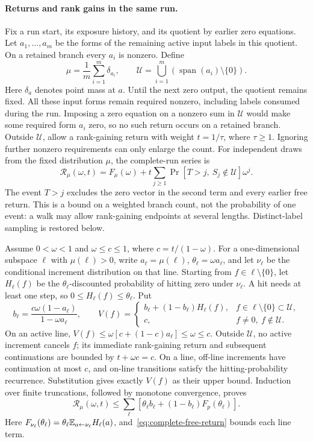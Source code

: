 \paragraph{Returns and rank gains in the same run.}
Fix a run start, its exposure history, and its quotient by earlier zero
equations. Let $a_1,\ldots,a_m$ be the forms of the remaining active
input labels in this quotient. On a retained branch every $a_i$ is
nonzero. Define
\[
 \mu=\frac1m\sum_{i=1}^m\delta_{a_i},\qquad
 \mathcal U=\bigcup_{i=1}^m
                 (\operatorname{span}(a_i)\setminus\{0\}).
\]
Here $\delta_a$ denotes point mass at $a$. Until the next zero output,
the quotient remains fixed. All these input forms remain required
nonzero, including labels consumed during the run. Imposing a zero
equation on a nonzero sum in $\mathcal U$ would make some required form
$a_i$ zero, so no such return occurs on a retained branch.
Outside $\mathcal U$, allow a rank-gaining return with
weight $t=1/\tau$, where $\tau\ge1$. Ignoring further nonzero requirements
can only enlarge the count. For independent draws from the fixed
distribution $\mu$, the complete-run series is
\[
 \mathcal R_\mu(\omega,t)=F_\mu(\omega)
       +t\sum_{j\ge1}\Pr[T>j,\ S_j\notin\mathcal U]\omega^j.
\]
The event $T>j$ excludes the zero vector in the second term and every
earlier free return. This is a bound on a weighted branch count, not
the probability of one event: a walk may allow rank-gaining endpoints
at several lengths. Distinct-label sampling is restored below.

Assume $0<\omega<1$ and $\omega\le c\le1$, where $c=t/(1-\omega)$.
For a one-dimensional subspace $\ell$ with $\mu(\ell)>0$,
write $a_\ell=\mu(\ell)$, $\theta_\ell=\omega a_\ell$, and let $\nu_\ell$ be
the conditional increment distribution on that line. Starting from
$f\in\ell\setminus\{0\}$, let $H_\ell(f)$ be the $\theta_\ell$-discounted
probability of hitting zero under $\nu_\ell$. A hit needs at least one
step, so $0\le H_\ell(f)\le\theta_\ell$. Put
\[
 b_\ell=\frac{c\omega(1-a_\ell)}{1-\omega a_\ell},\qquad
 V(f)=\begin{cases}
 b_\ell+(1-b_\ell)H_\ell(f),&f\in\ell\setminus\{0\}\subset\mathcal U,\\
 c,&f\ne0,\ f\notin\mathcal U.
 \end{cases}
\]
On an active line,
$V(f)\le\omega[c+(1-c)a_\ell]\le\omega\le c$.
Outside $\mathcal U$, no active increment cancels $f$; its immediate
rank-gaining return and subsequent continuations are bounded by
$t+\omega c=c$. On a line, off-line increments have continuation at most $c$,
and on-line transitions satisfy the hitting-probability recurrence.
Substitution gives exactly $V(f)$ as their upper bound. Induction over
finite truncations, followed by monotone convergence, proves
\[
 \mathcal R_\mu(\omega,t)
 \le\sum_\ell\left[\theta_\ell b_\ell+(1-b_\ell)F_p(\theta_\ell)\right].
\]
Here $F_{\nu_\ell}(\theta_\ell)=\theta_\ell\mathbb E_{a\gets\nu_\ell}H_\ell(a)$,
and~\eqref{eq:complete-free-return} bounds each line term.

